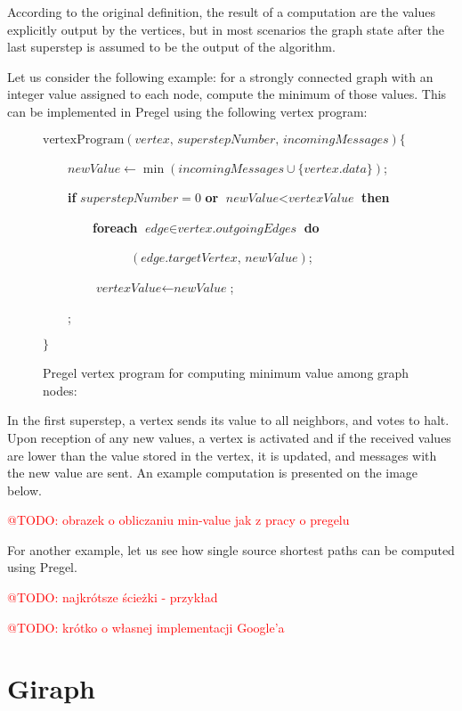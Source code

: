 \documentclass{pracamgr}
\makeatletter
\theoremstyle{plain}
\theoremstyle{definition}
\theoremstyle{remark}
\newcommand{\todo}[1]{\textcolor{red}{@TODO: #1}}
\makeatother
\begin{document}
According to the original definition, the result of a computation are the values explicitly output by the vertices, but in most scenarios the graph state after the last superstep is assumed to be the output of the algorithm.

Let us consider the following example: for a strongly connected graph with an integer value assigned to each node, compute the minimum of those values. This can be implemented in Pregel using the following vertex program:

\begin{figure}[h!]
\parbox{0.8\textwidth}{
$\text{vertexProgram}(\textit{vertex, superstepNumber, incomingMessages}) \{$

~~~~$\textit{newValue} \leftarrow \min(\textit{incomingMessages} \cup \{\textit{vertex.data}\})$;

~~~~\textbf{if} $superstepNumber = 0$ \textbf{or} $\textit{newValue} < \textit{vertexValue}$ \textbf{then}

~~~~~~~~\textbf{foreach} $\textit{edge} \in \textit{vertex.outgoingEdges}$ \textbf{do}

~~~~~~~~~~~~~~$(\textit{edge.targetVertex, newValue})$;

~~~~~~~~$\textit{vertexValue} \leftarrow \textit{newValue}$;

~~~~;

$\}$
}
\caption{Pregel vertex program for computing minimum value among graph nodes:}
\end{figure}

In the first superstep, a vertex sends its value to all neighbors, and votes to halt. Upon reception of any new values, a vertex is activated and if the received values are lower than the value stored in the vertex, it is updated, and messages with the new value are sent. An example computation is presented on the image below.

\todo{obrazek o obliczaniu min-value jak z pracy o pregelu}

For another example, let us see how single source shortest paths can be computed using Pregel.

\todo{najkrótsze ścieżki - przykład}

\todo{krótko o własnej implementacji Google'a}

\section{Giraph}
\end{document}
